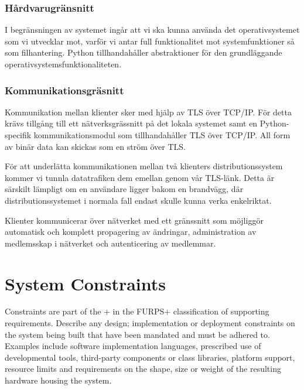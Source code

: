 \subsubsection{Hårdvarugränsnitt}
I begränsningen av systemet ingår att vi ska kunna använda det operativsystemet som vi utvecklar mot, varför vi antar full funktionalitet mot systemfunktioner så som filhantering. Python tillhandahåller abstraktioner för den grundläggande operativsystemsfunktionaliteten.

\subsubsection{Kommunikationsgräsnitt}
Kommunikation mellan klienter sker med hjälp av TLS över TCP/IP. För detta krävs tillgång till ett nätverksgrässnitt på det lokala systemet samt en Python-specifik kommunikationsmodul som tillhandahåller TLS över TCP/IP. All form av binär data kan skickas som en ström över TLS.

För att underlätta kommunikationen mellan två klienters distributionssystem kommer vi tunnla datatrafiken dem emellan genom vår TLS-länk. Detta är särskilt lämpligt om en användare ligger bakom en brandvägg, där distributionssystemet i normala fall endast skulle kunna verka enkelriktat.

Klienter kommunicerar över nätverket med ett gränssnitt som möjliggör automatisk och komplett propagering av ändringar, administration av medlemsskap i nätverket och autenticering av medlemmar.


\section{System Constraints}

Constraints are part of the + in the FURPS+ classification of supporting requirements. Describe any design; implementation or deployment constraints on the system being built that have been mandated and must be adhered to. Examples include software implementation languages, prescribed use of developmental tools, third-party components or class libraries, platform support, resource limits and requirements on the shape, size or weight of the resulting hardware housing the system.

